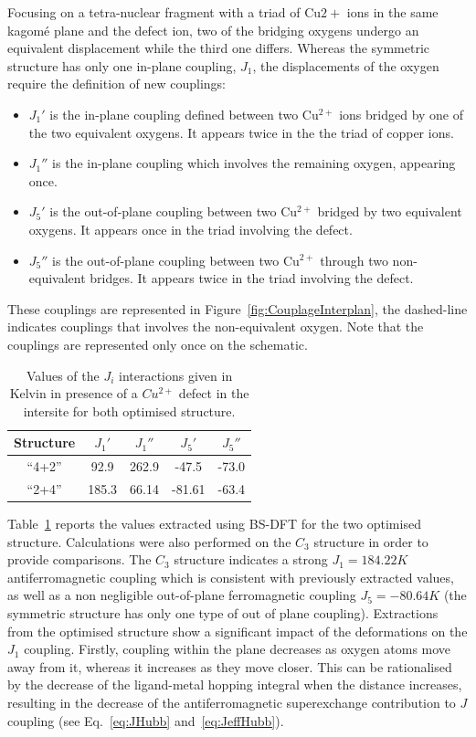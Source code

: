 \documentclass[12pt]{report}
\numberwithin{equation}{section}
\begin{document}
Focusing on a tetra-nuclear fragment with a triad of Cu${2+}$ ions in the same kagomé plane and the defect ion, two of the bridging oxygens undergo an equivalent displacement while the third one differs.
Whereas the symmetric structure has only one in-plane coupling, $J_1$, the displacements of the oxygen require the definition of new couplings:
\begin{itemize}
\item $J_1'$ is the in-plane coupling defined between two Cu$^{2+}$ ions bridged by one of the two equivalent oxygens. It appears twice in the the triad of copper ions.
\item $J_1''$ is the in-plane coupling which involves the remaining oxygen, appearing once.
\item $J_5'$ is the out-of-plane coupling between two Cu$^{2+}$ bridged by two equivalent oxygens. It appears once in the triad involving the defect.
\item $J_5''$ is the out-of-plane coupling between two Cu$^{2+}$ through two non-equivalent bridges. It appears twice in the triad involving the defect.
\end{itemize}
These couplings are represented in Figure~\ref{fig:CouplageInterplan}, the dashed-line indicates couplings that involves the non-equivalent oxygen.
Note that the couplings are represented only once on the schematic.

\begin{table}[!ht]
    \centering
    \begin{tabular}{c c c c c }
        \hline
        Structure & $J_1'$ & $J_1''$ & $J_5'$ & $J_5''$\\
        \hline
        ``4+2'' & 92.9 & 262.9 & -47.5 & -73.0\\
        ``2+4'' & 185.3 & 66.14 & -81.61 & -63.4\\
        \hline
    \end{tabular}
    \caption{Values of the $J_i$ interactions given in Kelvin in presence of a $Cu^{2+}$ defect in the intersite for both optimised structure.}
    \label{tab:DefautJ}
\end{table}



Table~\ref{tab:DefautJ} reports the values extracted using BS-DFT for the two optimised structure.
Calculations were also performed on the $C_3$ structure in order to provide comparisons.
The $C_3$ structure indicates a strong $J_1=184.22K$ antiferromagnetic coupling which is consistent with previously extracted values, as well as a non negligible out-of-plane ferromagnetic coupling $J_5=-80.64K$ (the symmetric structure has only one type of out of plane coupling). 
Extractions from the optimised structure show a significant impact of the deformations on the $J_1$ coupling.
Firstly, coupling within the plane decreases as oxygen atoms move away from it, whereas it increases as they move closer.
This can be rationalised by the decrease of the ligand-metal hopping integral when the distance increases, resulting in the decrease of the antiferromagnetic superexchange contribution to $J$ coupling (see Eq.~\ref{eq:JHubb} and~\ref{eq:JeffHubb}).
\end{document}
